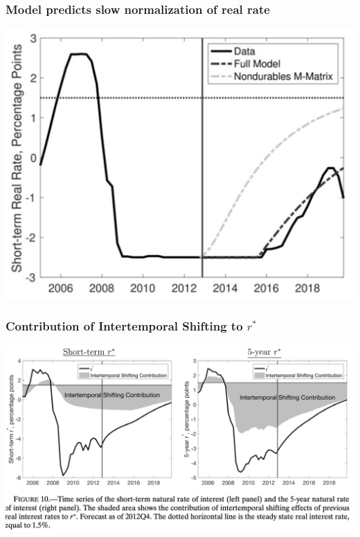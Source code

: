 \documentclass[english,xcolor=svgnames]{beamer}
\begin{document}
\begin{frame}
   \frametitle{Model predicts slow normalization of real rate}
    \begin{center}
    	\includegraphics[scale=0.3]{figures/MWFIG9.png}	
    \end{center}
\end{frame}

\begin{frame}
    \frametitle{Contribution of Intertemporal Shifting to $r^*$}
    \begin{center}
    	\includegraphics[scale=0.3]{figures/MWFIG10.png}	
    \end{center}
\end{frame}
\end{document}
